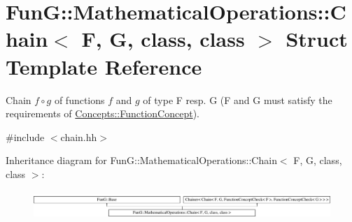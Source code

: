 \hypertarget{structFunG_1_1MathematicalOperations_1_1Chain}{\section{Fun\-G\-:\-:Mathematical\-Operations\-:\-:Chain$<$ F, G, class, class $>$ Struct Template Reference}
\label{structFunG_1_1MathematicalOperations_1_1Chain}
}


Chain $ f\circ g $ of functions $f$ and $g$ of type F resp. G (F and G must satisfy the requirements of \hyperlink{structFunG_1_1Concepts_1_1FunctionConcept}{Concepts\-::\-Function\-Concept}).  




{\ttfamily \#include $<$chain.\-hh$>$}

Inheritance diagram for Fun\-G\-:\-:Mathematical\-Operations\-:\-:Chain$<$ F, G, class, class $>$\-:\begin{figure}[H]
\begin{center}
\leavevmode
\includegraphics[height=1.078998cm]{structFunG_1_1MathematicalOperations_1_1Chain}
\end{center}
\end{figure}
